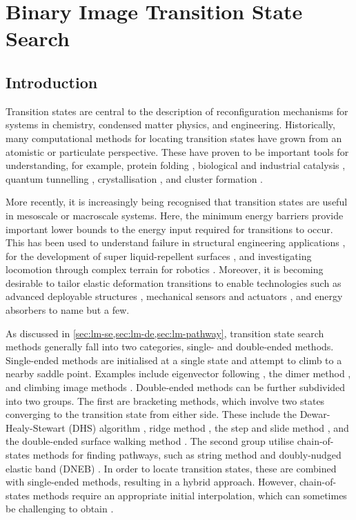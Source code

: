 \chapter{Binary Image Transition State Search}
\label{ch:bitss}
\graphicspath{{bitss/fig/}}


\section{Introduction}
Transition states are central to the description of reconfiguration mechanisms for systems in chemistry, condensed matter physics, and engineering.
Historically, many computational methods for locating transition states have grown from an atomistic or particulate perspective.
These have proven to be important tools for understanding, for example, protein folding \cite{Bryngelson1995,Onuchic1997}, biological and industrial catalysis \cite{Boehr2006,Kerns2015,Guo2018a}, quantum tunnelling \cite{Richardson2016,Vaillant2019}, crystallisation \cite{Richard2018}, and cluster formation \cite{Wales1998,Wales2012}.

More recently, it is increasingly being recognised that transition states are useful in mesoscale or macroscale systems.
Here, the minimum energy barriers provide important lower bounds to the energy input required for transitions to occur.
This has been used to understand failure in structural engineering applications \cite{Panter2019,Hutchinson2018}, for the development of super liquid-repellent surfaces \cite{Zhang2014,Panter2019a,Amabili2017}, and investigating locomotion through complex terrain for robotics \cite{Othayoth2020}.
Moreover, it is becoming desirable to tailor elastic deformation transitions to enable technologies such as advanced deployable structures \cite{Filipov2015,Zhai2018}, mechanical sensors and actuators \cite{Bertoldi2017,Truby2016,Chi2022,Bonfanti2020}, and energy absorbers \cite{Shan2015,Giri2021} to name but a few.

As discussed in \cref{sec:lm-se,sec:lm-de,sec:lm-pathway}, transition state search methods generally fall into two categories, single- and double-ended methods.
Single-ended methods are initialised at a single state and attempt to climb to a nearby saddle point.
Examples include eigenvector following \cite{Cerjan1981}, the dimer method \cite{Heyden2005,Kastner2008,Zhang2016}, and climbing image methods \cite{E2007,Ren2013}.
Double-ended methods can be further subdivided into two groups.
The first are bracketing methods, which involve two states converging to the transition state from either side.
These include the Dewar-Healy-Stewart (DHS) algorithm \cite{Dewar1984}, ridge method \cite{Ionova1993}, the step and slide method \cite{Miron2001}, and the double-ended surface walking method \cite{Zhang2013}.
The second group utilise chain-of-states methods for finding pathways, such as string method \cite{E2002,E2007} and doubly-nudged elastic band (DNEB) \cite{Trygubenko2004}.
In order to locate transition states, these are combined with single-ended methods, resulting in a hybrid approach.
However, chain-of-states methods require an appropriate initial interpolation, which can sometimes be challenging to obtain \cite{Wales2012a}.

